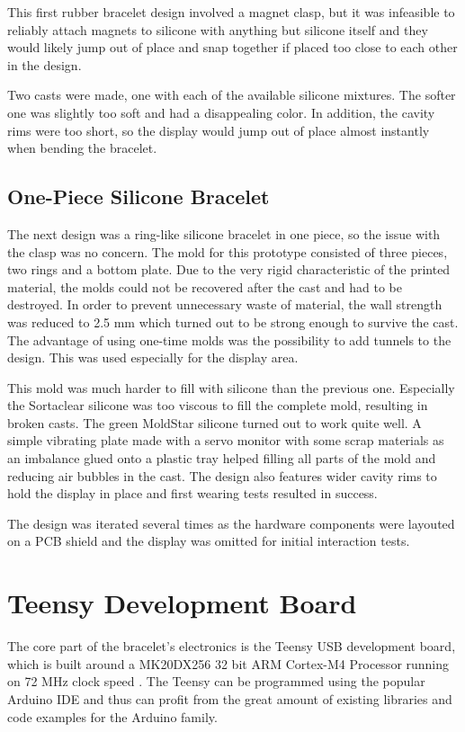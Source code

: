 This first rubber bracelet design involved a magnet clasp, but it was infeasible to reliably attach magnets to silicone with anything but silicone itself and they would likely jump out of place and snap together if placed too close to each other in the design.

Two casts were made, one with each of the available silicone mixtures. The softer one was slightly too soft and had a disappealing color. In addition, the cavity rims were too short, so the display would jump out of place almost instantly when bending the bracelet.

\subsection{One-Piece Silicone Bracelet}
The next design was a ring-like silicone bracelet in one piece, so the issue with the clasp was no concern. The mold for this prototype consisted of three pieces, two rings and a bottom plate. Due to the very rigid characteristic of the printed material, the molds could not be recovered after the cast and had to be destroyed. In order to prevent unnecessary waste of material, the wall strength was reduced to 2.5 mm which turned out to be strong enough to survive the cast. The advantage of using one-time molds was the possibility to add tunnels to the design. This was used especially for the display area.

This mold was much harder to fill with silicone than the previous one. Especially the Sortaclear silicone was too viscous to fill the complete mold, resulting in broken casts. The green MoldStar silicone turned out to work quite well. A simple vibrating plate made with a servo monitor with some scrap materials as an imbalance glued onto a plastic tray helped filling all parts of the mold and reducing air bubbles in the cast. The design also features wider cavity rims to hold the display in place and first wearing tests resulted in success.

The design was iterated several times as the hardware components were layouted on a \ac{PCB} shield and the display was omitted for initial interaction tests.

\section{Teensy Development Board}
The core part of the bracelet's electronics is the Teensy USB development board, which is built around a MK20DX256
32 bit ARM Cortex-M4 Processor running on 72 MHz clock speed \cite{teensy_web}. The Teensy can be programmed using the popular Arduino IDE and thus can profit from the great amount of existing libraries and code examples for the Arduino family.

